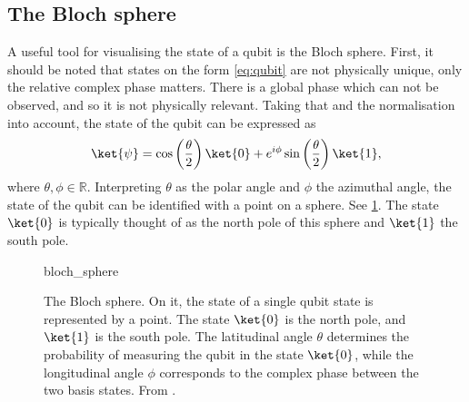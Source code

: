 \subsection{The Bloch sphere}
A useful tool for visualising the state of a qubit is the Bloch sphere.
First, it should be noted that states on the form \cref{eq:qubit} are not physically unique, only the relative complex phase matters.
There is a global phase which can not be observed, and so it is not physically relevant.
Taking that and the normalisation into account, the state of the qubit can be expressed as
\begin{equation}
    \ket{\psi} = \cos\left(\frac{\theta}{2}\right) \ket{0} + e^{i\phi} \sin\left(\frac{\theta}{2}\right) \ket{1},
    \label{eq:bloch}
\end{equation}
where $\theta, \phi \in \mathbb{R}$.
Interpreting $\theta$ as the polar angle and $\phi$ the azimuthal angle, the state of the qubit can be identified with a point on a sphere.
See \cref{fig:bloch}.
The state $\ket{0}$ is typically thought of as the north pole of this sphere and $\ket{1}$ the south pole.

\begin{figure}
    \centering
    \def\svgwidth{0.65\textwidth}
    {bloch_sphere}
    \caption{
        The Bloch sphere.
        On it, the state of a single qubit state is represented by a point.
        The state $\ket{0}$ is the north pole, and $\ket{1}$ is the south pole.
        The latitudinal angle $\theta$ determines the probability of measuring the qubit in the state $\ket{0}$, while the longitudinal angle $\phi$ corresponds to the complex phase between the two basis states.
        From \cite{wikipedia_bloch}.
    }
    \label{fig:bloch}
\end{figure}

